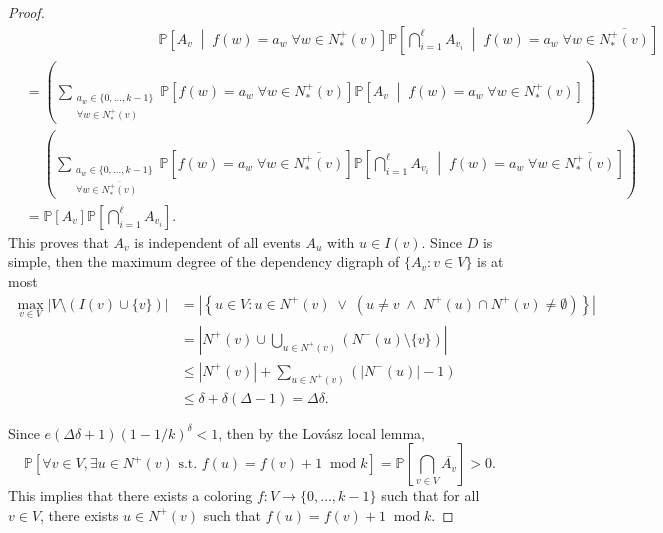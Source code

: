 \documentclass[letterpaper, reqno,11pt]{article}
\newcommand{\PP}{\mathbb{P}}
\DeclareMathOperator{\Mod}{mod}
\begin{document}
\begin{enumerate}
\begin{proof}
\begin{align*}
      &\qquad \qquad \qquad \qquad \quad\;\; \PP\left[A_v \;\middle|\; f(w) = a_w \;\forall w \in N_*^+(v)\right] \PP\left[\bigcap_{i = 1}^\ell A_{v_i} \;\middle|\; f(w) = a_w \;\forall w \in \overline{N_*^+(v)}\right] \\
      &= \left(\sum_{\substack{ a_w \in \{ 0, \ldots, k - 1 \} \\ \forall w \in N_*^+(v) }} \PP\left[f(w) = a_w \;\forall w \in N_*^+(v)\right] \PP\left[A_v \;\middle|\; f(w) = a_w \;\forall w \in N_*^+(v)\right]\right) \\
      &\quad\; \left(\sum_{\substack{ a_w \in \{ 0, \ldots, k - 1 \} \\ \forall w \in \overline{N_*^+(v)} }} \PP\left[f(w) = a_w \;\forall w \in \overline{N_*^+(v)}\right] \PP\left[\bigcap_{i = 1}^\ell A_{v_i} \;\middle|\; f(w) = a_w \;\forall w \in \overline{N_*^+(v)}\right]\right) \\
      &= \PP\left[A_v\right] \PP\left[\bigcap_{i = 1}^\ell A_{v_i}\right].
    \end{align*}
    This proves that $A_v$ is independent of all events $A_u$ with $u \in I(v)$. Since $D$ is simple, then the maximum degree of the dependency digraph of $\{ A_v : v \in V \}$ is at most
    \begin{align*}
      \max_{v \in V} |V \setminus (I(v) \cup \{ v \})| &= \left|\left\{ u \in V : u \in N^+(v) \;\vee\; \left(u \neq v \;\wedge\; N^+(u) \cap N^+(v) \neq \emptyset\right) \right\}\right| \\
      &= \left|N^+(v) \cup \bigcup_{u \in N^+(v)} \left(N^-(u) \setminus \{ v \}\right)\right| \\
      &\leq \left|N^+(v)\right| + \sum_{u \in N^+(v)} \left(\left|N^-(u)\right| - 1\right) \\
      &\leq \delta + \delta(\Delta - 1) = \Delta \delta.
    \end{align*}

    Since $e(\Delta \delta + 1) (1 - 1/k)^\delta < 1$, then by the Lov\'{a}sz local lemma,
    $$ \PP[\forall v \in V, \exists u \in N^+(v) \text{ s.t.\ } f(u) = f(v) + 1 \;\Mod{k}] = \PP\left[\bigcap_{v \in V} \overline{A_v}\right] > 0. $$
    This implies that there exists a coloring $f : V \to \{ 0, \ldots, k - 1 \}$ such that for all $v \in V$, there exists $u \in N^+(v)$ such that $f(u) = f(v) + 1 \;\Mod{k}$.
    

\end{proof}
\end{enumerate}
\end{document}
